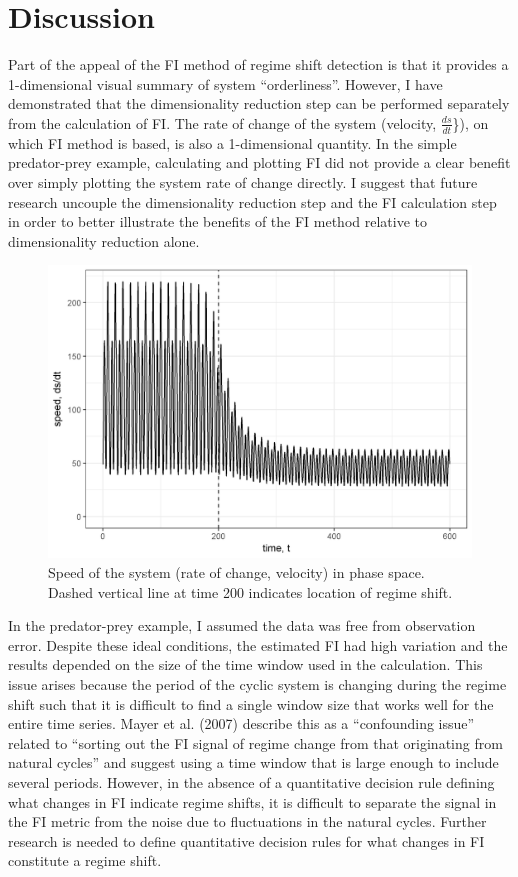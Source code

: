 \documentclass[12pt,twoside,openany]{reedthesis}
\begin{document}
\hypertarget{discussion}{%
\section{Discussion}\label{discussion}}

Part of the appeal of the FI method of regime shift detection is that it provides a 1-dimensional visual summary of system ``orderliness''. However, I have demonstrated that the dimensionality reduction step can be performed separately from the calculation of FI. The rate of change of the system (velocity, \(\frac{ds}{dt}\)\}), on which FI method is based, is also a 1-dimensional quantity. In the simple predator-prey example, calculating and plotting FI did not provide a clear benefit over simply plotting the system rate of change directly. I suggest that future research uncouple the dimensionality reduction step and the FI calculation step in order to better illustrate the benefits of the FI method relative to dimensionality reduction alone.
\begin{figure}
\includegraphics[width=0.85\linewidth]{./chapterFiles/fiGuide/figures/dsdtOverTime} \caption{Speed of the system (rate of change, velocity) in phase space. Dashed vertical line at time 200 indicates location of regime shift.}\label{fig:dsdtOverTime}
\end{figure}
In the predator-prey example, I assumed the data was free from observation error. Despite these ideal conditions, the estimated FI had high variation and the results depended on the size of the time window used in the calculation. This issue arises because the period of the cyclic system is changing during the regime shift such that it is difficult to find a single window size that works well for the entire time series. Mayer et al. (2007) describe this as a ``confounding issue'' related to ``sorting out the FI signal of regime change from that originating from natural cycles'' and suggest using a time window that is large enough to include several periods. However, in the absence of a quantitative decision rule defining what changes in FI indicate regime shifts, it is difficult to separate the signal in the FI metric from the noise due to fluctuations in the natural cycles. Further research is needed to define quantitative decision rules for what changes in FI constitute a regime shift.
\end{document}

